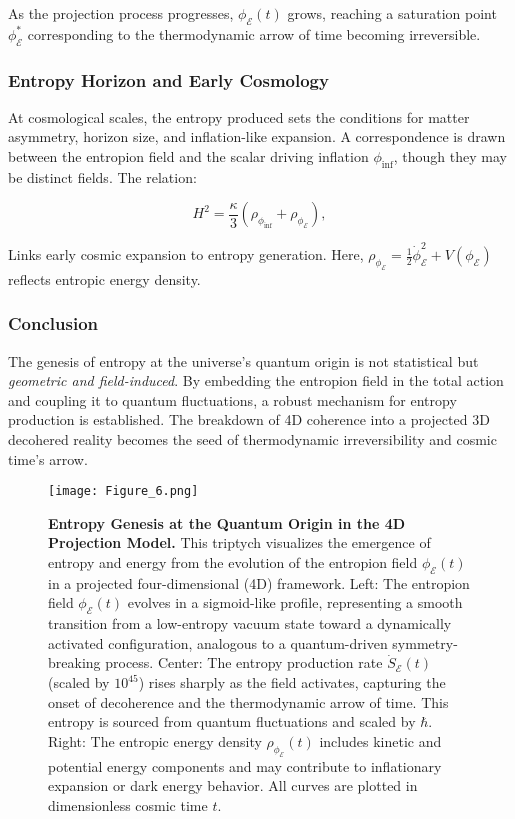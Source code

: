 \documentclass[12pt]{article}
\begin{document}
As the projection process progresses, \(\phi_{\mathcal{E}}(t)\) grows, reaching a saturation point \(\phi_{\mathcal{E}}^\ast\) corresponding to the thermodynamic arrow of time becoming irreversible.

\subsubsection*{Entropy Horizon and Early Cosmology}

At cosmological scales, the entropy produced sets the conditions for matter asymmetry, horizon size, and inflation-like expansion. A correspondence is drawn between the entropion field and the scalar driving inflation \(\phi_{\text{inf}}\), though they may be distinct fields. The relation:

\begin{equation}
\label{eq:entropic_hubble_link}
H^2 = \frac{\kappa}{3} \left( \rho_{\phi_{\text{inf}}} + \rho_{\phi_{\mathcal{E}}} \right),
\end{equation}

Links early cosmic expansion to entropy generation. Here, \(\rho_{\phi_{\mathcal{E}}} = \frac{1}{2} \dot{\phi}_{\mathcal{E}}^2 + V(\phi_{\mathcal{E}})\) reflects entropic energy density.

\subsubsection*{Conclusion}

The genesis of entropy at the universe’s quantum origin is not statistical but \emph{geometric and field-induced}. By embedding the entropion field in the total action and coupling it to quantum fluctuations, a robust mechanism for entropy production is established. The breakdown of 4D coherence into a projected 3D decohered reality becomes the seed of thermodynamic irreversibility and cosmic time’s arrow.
\begin{figure}[htbp]
    \centering
    \texttt{[image: Figure\_6.png]}
    \caption{
        \textbf{Entropy Genesis at the Quantum Origin in the 4D Projection Model.}
        This triptych visualizes the emergence of entropy and energy from the evolution of the entropion field $\phi_{\mathcal{E}}(t)$ in a projected four-dimensional (4D) framework. 
        Left: The entropion field $\phi_{\mathcal{E}}(t)$ evolves in a sigmoid-like profile, representing a smooth transition from a low-entropy vacuum state toward a dynamically activated configuration, analogous to a quantum-driven symmetry-breaking process. 
        Center: The entropy production rate $\dot{S}_{\mathcal{E}}(t)$ (scaled by $10^{45}$) rises sharply as the field activates, capturing the onset of decoherence and the thermodynamic arrow of time. This entropy is sourced from quantum fluctuations and scaled by $\hbar$. 
        Right: The entropic energy density $\rho_{\phi_{\mathcal{E}}}(t)$ includes kinetic and potential energy components and may contribute to inflationary expansion or dark energy behavior. All curves are plotted in dimensionless cosmic time $t$.
    }
    \label{fig:entropy_genesis}
\end{figure}
\end{document}
